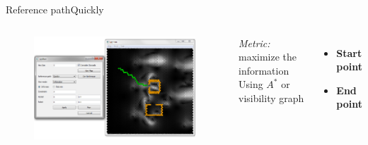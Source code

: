 \begin{frame}{Reference path}{Quickly}

\begin{columns}
\begin{figure}
\centering
\includegraphics[width = \textwidth]{./screenshot/quickly_reference_path.png}
\end{figure}

\begin{minipage}{\textwidth}
\emph{Metric:} maximize the information
\bigskip
Using $ A^{*} $ or visibility graph
\begin{itemize}
\item \textbf{Start point}
\item \textbf{End point}
\end{itemize}
\end{minipage}
\end{columns}

\end{frame}

